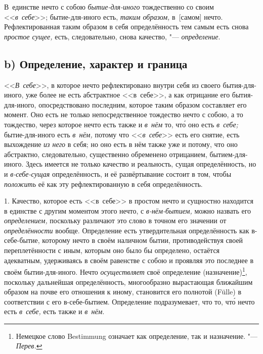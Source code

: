 В~единстве нечто с собою {\em бытие-для-иного}
тождественно со своим <<{\em в~себе}>>; бытие-для-иного
есть, {\em таким образом,} в~[самом] нечто.
Рефлектированная таким образом в себя определённость тем самым есть снова
{\em простое сущее,} есть, следовательно, снова
качество, "--- {\em определение}.

\subsection[b) Определение, характер и граница]{b) Определение, характер и граница}

<<{\em В~себе}>>, в которое нечто рефлектировано внутри
себя из своего бытия-для-иного, уже более не есть абстрактное <<в~себе>>,
а как отрицание его бытия-для-иного, опосредствовано последним, которое
таким образом составляет его момент. Оно есть не только непосредственное
тождество нечто с собою, а то тождество, через которое нечто есть также и
{\em в~нём} то, чт\'{о} оно есть {\em в~себе;}
бытие-для-иного есть {\em в~нём,} потому что
<<{\em в~себе}>> есть его снятие, есть выхождение
{\em из него} в себя; но оно есть в нём также уже и
потому, что оно абстрактно, следовательно, существенно обременено
отрицанием, бытием-для-иного. Здесь имеется не только качество и
реальность, сущая определённость, но и
{\em в-себе-сущая} определённость, и её развёртывание
состоит в том, чтобы {\em положить} её как эту
рефлектированную в себя определённость.

1. Качество, которое есть <<в~себе>> в простом нечто и сущностно находится в
единстве с другим моментом этого нечто, с {\em в-нём-бытием,} можно назвать его
{\em определением,} поскольку различают это слово в точном его значении от
{\em определённости} вообще. Определение есть утвердительная определённость как
в-себе-бытие, которому нечто в своём наличном бытии, противодействуя своей
переплетённости с иным, которым оно было бы определено, остаётся адекватным,
удерживаясь в своём равенстве с собою и проявляя это последнее в своём
бытии-для-иного. Нечто {\em осуществляет} своё определение
(назначение)\footnote{Немецкое слово Bestimmung означает как определение, так и
назначение. "--- {\em Перев.}}, поскольку дальнейшая определённость,
многообразно вырастающая ближайшим образом на почве его отношения к иному,
становится его полнотой (Fülle) в соответствии с его в-себе-бытием. Определение
подразумевает, что то, чт\'{о} нечто есть {\em в~себе,} есть также и
{\em в~нём}.

